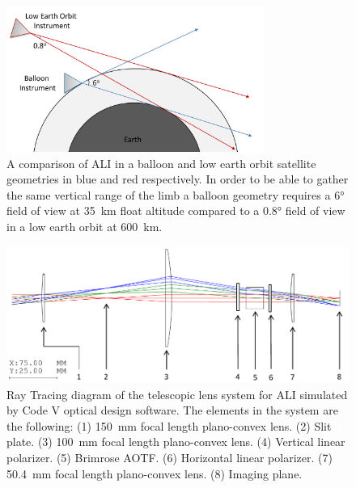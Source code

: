 \documentclass[12pt]{article}
\begin{document}
\newpage

\begin{figure}
        \centering
        \includegraphics[width=0.75\textwidth]{./Images/5-4-BalloonGeometry.pdf}
        \caption{A comparison of ALI in a balloon and low earth orbit satellite geometries in blue and red respectively. In order to be able to gather the same vertical range of the limb a balloon geometry requires a 6\si{\degree} field of view at 35~km float altitude compared to a 0.8\si{\degree} field of view in a low earth orbit at 600~km.}
        \label{fig:5.4:balloonGeometry}
\end{figure}

\newpage

\begin{figure}
    \includegraphics[width=1.0\textwidth]{./Images/3-2-TelescopicRayTracing.pdf}
    \caption{Ray Tracing diagram of the telescopic lens system for ALI simulated by Code V optical design software. The elements in the system are the following: (1) 150~mm focal length plano-convex lens. (2) Slit plate. (3) 100~mm focal length plano-convex lens. (4) Vertical linear polarizer. (5) Brimrose AOTF. (6) Horizontal linear polarizer. (7) 50.4~mm focal length plano-convex lens. (8) Imaging plane.}
    \label{fig:3.2:telescopicRayTracing}
\end{figure}

\newpage
\end{document}
